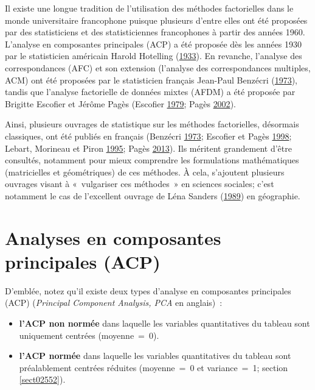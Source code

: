 \documentclass[
  11pt,
  french,
]{book}
\providecommand{\tightlist}{%
  \setlength{\itemsep}{0pt}\setlength{\parskip}{0pt}}
\begin{document}
Il existe une longue tradition de l'utilisation des méthodes factorielles dans le monde universitaire francophone puisque plusieurs d'entre elles ont été proposées par des statisticiens et des statisticiennes francophones à partir des années 1960. L'analyse en composantes principales (ACP) a été proposée dès les années 1930 par le statisticien américain Harold Hotelling (\protect\hyperlink{ref-hotelling1933analysis}{1933}). En revanche, l'analyse des correspondances (AFC) et son extension (l'analyse des correspondances multiples, ACM) ont été proposées par le statisticien français Jean-Paul Benzécri (\protect\hyperlink{ref-benzecri1973analyse}{1973}), tandis que l'analyse factorielle de données mixtes (AFDM) a été proposée par Brigitte Escofier et Jérôme Pagès (Escofier \protect\hyperlink{ref-escofier1979traitement}{1979}; Pagès \protect\hyperlink{ref-pages2002analyse}{2002}).

Ainsi, plusieurs ouvrages de statistique sur les méthodes factorielles, désormais classiques, ont été publiés en français (Benzécri \protect\hyperlink{ref-benzecri1973analyse}{1973}; Escofier et Pagès \protect\hyperlink{ref-escofier1998analyses}{1998}; Lebart, Morineau et Piron \protect\hyperlink{ref-lebart1995statistique}{1995}; Pagès \protect\hyperlink{ref-pages2013analyse}{2013}). Ils méritent grandement d'être consultés, notamment pour mieux comprendre les formulations mathématiques (matricielles et géométriques) de ces méthodes. À cela, s'ajoutent plusieurs ouvrages visant à «~vulgariser ces méthodes~» en sciences sociales; c'est notamment le cas de l'excellent ouvrage de Léna Sanders (\protect\hyperlink{ref-sanders1989analyse}{1989}) en géographie.

\hypertarget{sect122}{%
\section{Analyses en composantes principales (ACP)}\label{sect122}}

D'emblée, notez qu'il existe deux types d'analyse en composantes principales (ACP) (\emph{Principal Component Analysis, PCA} en anglais)~:

\begin{itemize}
\tightlist
\item
  \textbf{l'ACP non normée} dans laquelle les variables quantitatives du tableau sont uniquement centrées (moyenne~=~0).
\item
  \textbf{l'ACP normée} dans laquelle les variables quantitatives du tableau sont préalablement centrées réduites (moyenne~=~0 et variance~=~1; section \ref{sect02552}).
\end{itemize}
\end{document}
